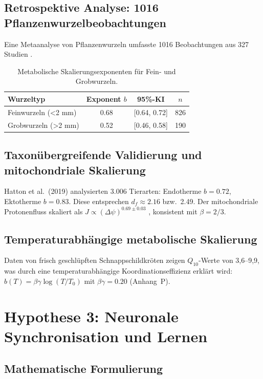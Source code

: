 \documentclass[11pt,a4paper]{article}
\begin{document}
	\subsection{Retrospektive Analyse: 1016 Pflanzenwurzelbeobachtungen}
	
	Eine Metaanalyse von Pflanzenwurzeln umfasste 1016 Beobachtungen aus 327 Studien \cite{Yuan2020}.
	
	\begin{table}[H]
		\centering
		\caption{Metabolische Skalierungsexponenten für Fein- und Grobwurzeln.}
		\label{tab:plant-scaling}
		\begin{tabular}{lccc}
			\toprule
			\textbf{Wurzeltyp} & \textbf{Exponent \(b\)} & \textbf{95\%-KI} & \textbf{\(n\)} \\
			\midrule
			Feinwurzeln (<2 mm) & 0.68 & [0.64, 0.72] & 826 \\
			Grobwurzeln (>2 mm) & 0.52 & [0.46, 0.58] & 190 \\
			\bottomrule
		\end{tabular}
	\end{table}
	
	\subsection{Taxonübergreifende Validierung und mitochondriale Skalierung}
	
	Hatton et al.\ (2019) analysierten 3.006 Tierarten: Endotherme \(b=0.72\), Ektotherme \(b=0.83\). Diese entsprechen \(d_f \approx 2.16\) bzw.\ 2.49. Der mitochondriale Protonenfluss skaliert als \(J \propto (\Delta \psi)^{0.69 \pm 0.03}\) \cite{West2023}, konsistent mit \(\beta=2/3\).
	
	\subsection{Temperaturabhängige metabolische Skalierung}
	
	Daten von frisch geschlüpften Schnappschildkröten zeigen \(Q_{10}\)-Werte von 3,6--9,9, was durch eine temperaturabhängige Koordinationseffizienz erklärt wird: \(b(T) = \beta\gamma \log(T/T_0)\) mit \(\beta\gamma = 0.20\) (Anhang~P).
	
	\section{Hypothese 3: Neuronale Synchronisation und Lernen}
	
	\subsection{Mathematische Formulierung}
	
\end{document}
